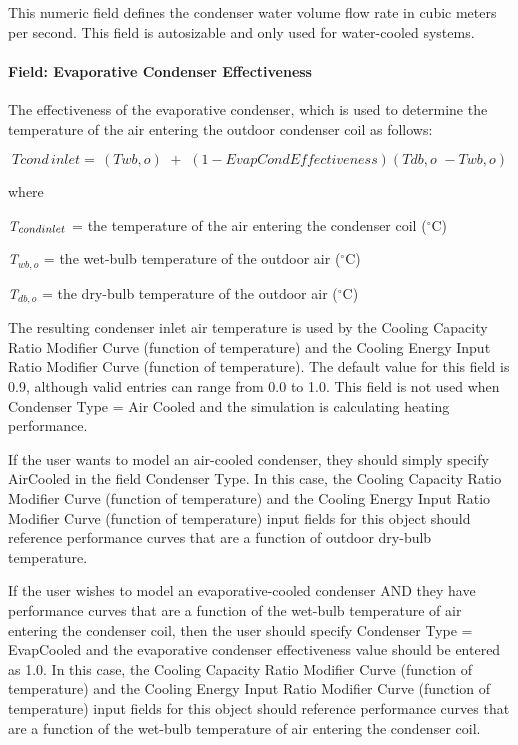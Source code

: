 This numeric field defines the condenser water volume flow rate in cubic meters per second. This field is autosizable and only used for water-cooled systems.

\paragraph{Field: Evaporative Condenser Effectiveness}\label{field-evaporative-condenser-effectiveness-002}

The effectiveness of the evaporative condenser, which is used to determine the temperature of the air entering the outdoor condenser coil as follows:

\begin{equation}
Tcond\,inlet = \,\left( {Twb,o} \right)\,\, + \,\,\left( {1 - EvapCondEffectiveness} \right)\left( {Tdb,o\,\, - Twb,o} \right)
\end{equation}

where

\emph{T\(_{cond\\ inlet}\)} = the temperature of the air entering the condenser coil ($^\circ$C)

\emph{T\(_{wb,o}\)} = the wet-bulb temperature of the outdoor air ($^\circ$C)

\emph{T\(_{db,o}\)} = the dry-bulb temperature of the outdoor air ($^\circ$C)

The resulting condenser inlet air temperature is used by the Cooling Capacity Ratio Modifier Curve (function of temperature) and the Cooling Energy Input Ratio Modifier Curve (function of temperature). The default value for this field is 0.9, although valid entries can range from 0.0 to 1.0. This field is not used when Condenser Type = Air Cooled and the simulation is calculating heating performance.

If the user wants to model an air-cooled condenser, they should simply specify AirCooled in the field Condenser Type. In this case, the Cooling Capacity Ratio Modifier Curve (function of temperature) and the Cooling Energy Input Ratio Modifier Curve (function of temperature) input fields for this object should reference performance curves that are a function of outdoor dry-bulb temperature.

If the user wishes to model an evaporative-cooled condenser AND they have performance curves that are a function of the wet-bulb temperature of air entering the condenser coil, then the user should specify Condenser Type = EvapCooled and the evaporative condenser effectiveness value should be entered as 1.0. In this case, the Cooling Capacity Ratio Modifier Curve (function of temperature) and the Cooling Energy Input Ratio Modifier Curve (function of temperature) input fields for this object should reference performance curves that are a function of the wet-bulb temperature of air entering the condenser coil.

